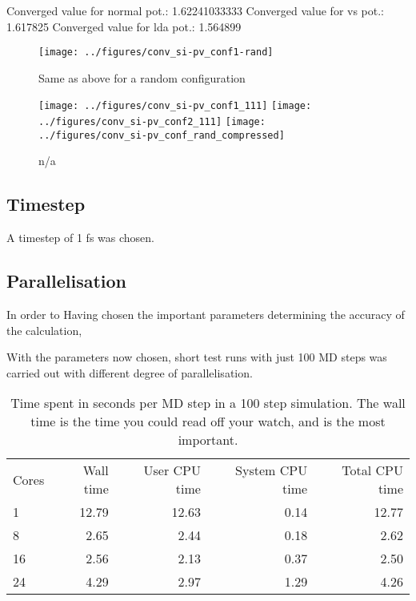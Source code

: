 \documentclass[11pt,bibliography=totoc,index=totoc]{scrbook}   %
\begin{document}
Converged value for normal pot.: 1.62241033333
Converged value for vs pot.: 1.617825
Converged value for lda pot.: 1.564899


\begin{figure}[htbp]
  \begin{center}
    \texttt{[image: ../figures/conv\_si-pv\_conf1-rand]}
  \end{center}
  \caption{Same as above for a random configuration}
  \label{fig:figs/conv_si-pv_conf1-rand}
\end{figure}


\begin{figure}[htbp]
  \begin{center}
    \texttt{[image: ../figures/conv\_si-pv\_conf1\_111]}
    \texttt{[image: ../figures/conv\_si-pv\_conf2\_111]}
    \texttt{[image: ../figures/conv\_si-pv\_conf\_rand\_compressed]}
  \end{center}
  \caption{n/a}
  \label{fig:figs/conv_si-pv_conf}
\end{figure}




\subsection{Timestep}

A timestep of 1 fs was chosen.

\cite{Richie:2004}


\subsection{Parallelisation}

In order to 
Having chosen the important parameters determining the accuracy of the calculation, 

With the parameters now chosen, short test runs with just 100 MD steps was carried out with different degree of parallelisation.


\begin{table}[htbp]
  \centering
  \begin{tabular}{lrrrr}
    Cores & Wall time & User CPU time & System CPU time & Total CPU time \\
    1     & 12.79 & 12.63 & 0.14 & 12.77 \\
    8     & 2.65 & 2.44 & 0.18 & 2.62 \\
    16    & 2.56 & 2.13 & 0.37 & 2.50 \\
    24    & 4.29 & 2.97 & 1.29 & 4.26 \\
  \end{tabular}
  \caption{Time spent in seconds per MD step in a 100 step simulation. The wall time is the time you could read off your watch, and is the most important.}
  \label{tab:}
\end{table}
\end{document}
